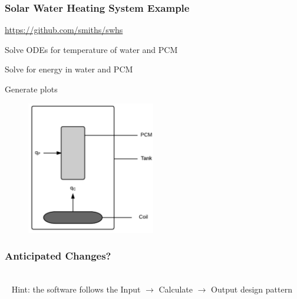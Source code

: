 \documentclass[t,12pt,numbers,fleqn]{beamer}
\begin{document}
\begin{frame}
\frametitle{Solar Water Heating System Example}

\bi
\item \href{https://github.com/smiths/swhs}{https://github.com/smiths/swhs}
\item Solve ODEs for temperature of water and PCM
\item Solve for energy in water and PCM
\item Generate plots
\ei

\begin{figure}
{
\includegraphics[width=0.5\textwidth]{../Figures/Tank.pdf}
}
\end{figure}

\end{frame}


\begin{frame}
\frametitle{Anticipated Changes?}

\\
~\newline
Hint: the software follows the Input $\rightarrow$ Calculate $\rightarrow$
Output design pattern

\end{frame}

\end{document}
